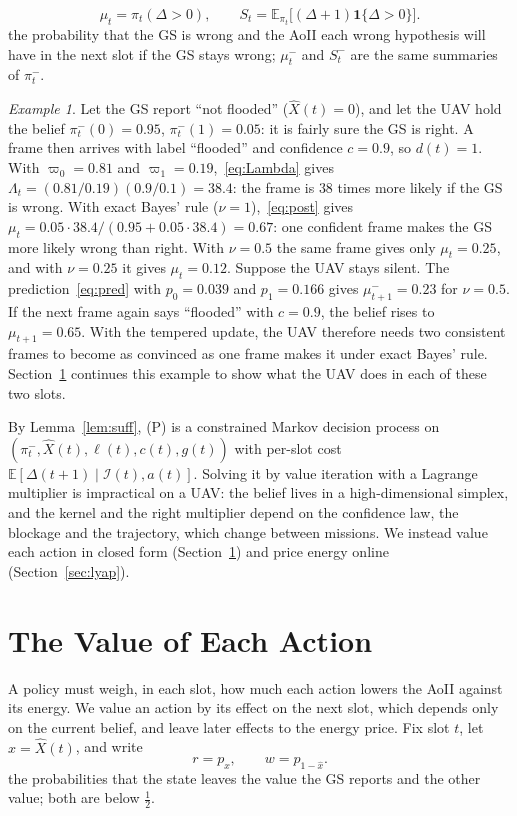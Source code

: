 \documentclass[10pt,journal,compsoc]{IEEEtran}
\theoremstyle{remark}
\newtheorem{example}{Example}
\newcommand{\E}{\mathbb{E}}
\newcommand{\ind}[1]{\mathbf{1}\{#1\}}
\newcommand{\I}{\mathcal{I}}
\newcommand{\lab}{\ell}
\newcommand{\xh}{\hat{x}}
\begin{document}
\begin{equation}\label{eq:musum}
\mu_t=\pi_t(\Delta>0),\qquad S_t=\E_{\pi_t}\big[(\Delta+1)\ind{\Delta>0}\big].
\end{equation}
the probability that the GS is wrong and the AoII each wrong hypothesis will have in the next slot if the GS stays wrong; $\mu^-_t$ and $S^-_t$ are the same summaries of $\pi^-_t$.


\begin{example}\label{ex:belief}
Let the GS report ``not flooded'' ($\hat X(t)=0$), and let the UAV hold the belief $\pi^-_t(0)=0.95$, $\pi^-_t(1)=0.05$: it is fairly sure the GS is right. A frame then arrives with label ``flooded'' and confidence $c=0.9$, so $d(t)=1$. With $\varpi_0=0.81$ and $\varpi_1=0.19$,~\eqref{eq:Lambda} gives $\Lambda_t=(0.81/0.19)(0.9/0.1)=38.4$: the frame is $38$ times more likely if the GS is wrong. With exact Bayes' rule ($\nu=1$),~\eqref{eq:post} gives $\mu_t=0.05\cdot38.4/(0.95+0.05\cdot38.4)=0.67$: one confident frame makes the GS more likely wrong than right. With $\nu=0.5$ the same frame gives only $\mu_t=0.25$, and with $\nu=0.25$ it gives $\mu_t=0.12$. Suppose the UAV stays silent. The prediction~\eqref{eq:pred} with $p_0=0.039$ and $p_1=0.166$ gives $\mu^-_{t+1}=0.23$ for $\nu=0.5$. If the next frame again says ``flooded'' with $c=0.9$, the belief rises to $\mu_{t+1}=0.65$. With the tempered update, the UAV therefore needs two consistent frames to become as convinced as one frame makes it under exact Bayes' rule. Section~\ref{sec:structure} continues this example to show what the UAV does in each of these two slots.
\end{example}

By Lemma~\ref{lem:suff}, (P) is a constrained Markov decision process on $(\pi^-_t,\hat X(t),\lab(t),c(t),g(t))$ with per-slot cost $\E[\Delta(t+1)\mid\I(t),a(t)]$. Solving it by value iteration with a Lagrange multiplier is impractical on a UAV: the belief lives in a high-dimensional simplex, and the kernel and the right multiplier depend on the confidence law, the blockage and the trajectory, which change between missions. We instead value each action in closed form (Section~\ref{sec:structure}) and price energy online (Section~\ref{sec:lyap}).

\section{The Value of Each Action}\label{sec:structure}
A policy must weigh, in each slot, how much each action lowers the AoII against its energy. We value an action by its effect on the next slot, which depends only on the current belief, and leave later effects to the energy price. Fix slot $t$, let $\xh=\hat X(t)$, and write
\begin{equation}\label{eq:rw}
r=p_{\xh},\qquad w=p_{1-\xh}.
\end{equation}
the probabilities that the state leaves the value the GS reports and the other value; both are below $\frac12$.
\end{document}
